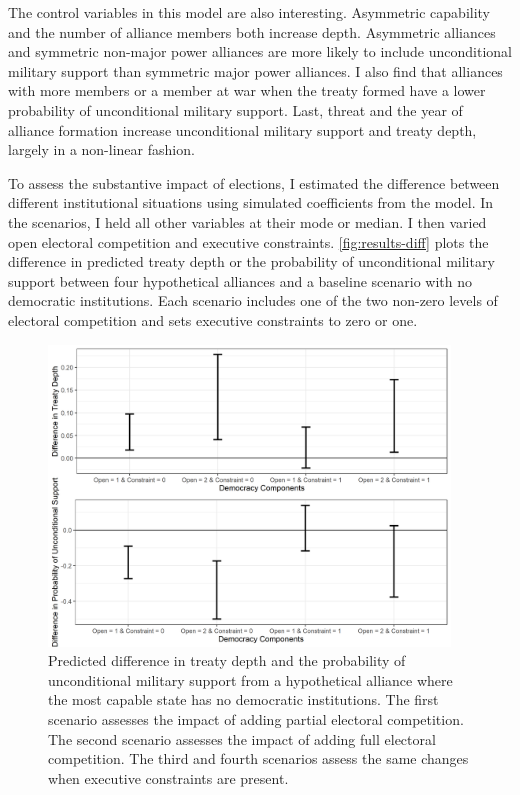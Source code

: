 \documentclass[12pt]{article}
\begin{document}
The control variables in this model are also interesting.
Asymmetric capability and the number of alliance members both increase depth. 
Asymmetric alliances and symmetric non-major power alliances are more likely to include unconditional military support than symmetric major power alliances. 
I also find that alliances with more members or a member at war when the treaty formed have a lower probability of unconditional military support. 
Last, threat and the year of alliance formation increase unconditional military support and treaty depth, largely in a non-linear fashion.


To assess the substantive impact of elections, I estimated the difference between different institutional situations using simulated coefficients from the model. 
In the scenarios, I held all other variables at their mode or median. 
I then varied open electoral competition and executive constraints. 
\autoref{fig:results-diff} plots the difference in predicted treaty depth or the probability of unconditional military support between four hypothetical alliances and a baseline scenario with no democratic institutions. 
Each scenario includes one of the two non-zero levels of electoral competition and sets executive constraints to zero or one. 


\begin{figure}[hbtp]
\centering
\includegraphics[width=0.95\textwidth]{../figures/results-diff.png}
\caption{Predicted difference in treaty depth and the probability of unconditional military support from a hypothetical alliance where the most capable state has no democratic institutions. The first scenario assesses the impact of adding partial electoral competition. The second scenario assesses the impact of adding full electoral competition. The third and fourth scenarios assess the same changes when executive constraints are present.}
\label{fig:results-diff}
\end{figure}
\end{document}
